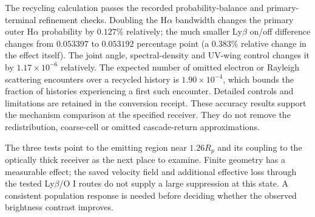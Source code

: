 The recycling calculation passes the recorded probability-balance and
primary-terminal refinement checks. Doubling the H$\alpha$ bandwidth changes
the primary outer H$\alpha$ probability by $0.127\%$ relatively;
the much smaller Ly$\beta$ on/off difference changes from $0.053397$ to
$0.053192$ percentage point (a $0.383\%$ relative change in the effect itself).
The joint angle, spectral-density and UV-wing control changes it by
$1.17\times10^{-6}$ relatively. The expected number of omitted electron or
Rayleigh scattering encounters over a recycled history is $1.90\times10^{-4}$,
which bounds the fraction of histories experiencing a first such encounter.
Detailed controls and limitations are retained in the conversion receipt.
These accuracy results support the
mechanism comparison at the specified receiver. They do not remove the
redistribution, coarse-cell or omitted cascade-return approximations.

The three tests point to the emitting region near $1.26R_p$ and its coupling
to the optically thick receiver as the next place to examine. Finite geometry
has a measurable effect; the saved velocity field and additional effective
loss through the tested Ly$\beta$/O I routes do not supply a large suppression
at this state. A consistent population response is needed before deciding
whether the observed brightness contrast improves.
